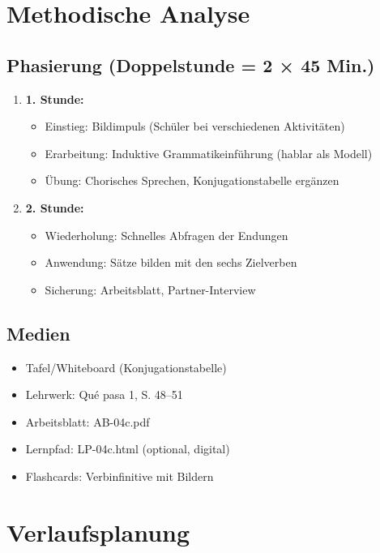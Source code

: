 \documentclass[11pt,a4paper]{article}
\newcommand{\lehrwerk}{Qué pasa 1}
\newcommand{\lehrwerkseite}{S. 48--51}
\begin{document}
\section{Methodische Analyse}

\subsection{Phasierung (Doppelstunde = 2 × 45 Min.)}
\begin{enumerate}
    \item \textbf{1. Stunde:}
    \begin{itemize}
        \item Einstieg: Bildimpuls (Schüler bei verschiedenen Aktivitäten)
        \item Erarbeitung: Induktive Grammatikeinführung (hablar als Modell)
        \item Übung: Chorisches Sprechen, Konjugationstabelle ergänzen
    \end{itemize}
    \item \textbf{2. Stunde:}
    \begin{itemize}
        \item Wiederholung: Schnelles Abfragen der Endungen
        \item Anwendung: Sätze bilden mit den sechs Zielverben
        \item Sicherung: Arbeitsblatt, Partner-Interview
    \end{itemize}
\end{enumerate}

\subsection{Medien}
\begin{itemize}
    \item Tafel/Whiteboard (Konjugationstabelle)
    \item Lehrwerk: \lehrwerk, \lehrwerkseite
    \item Arbeitsblatt: AB-04c.pdf
    \item Lernpfad: LP-04c.html (optional, digital)
    \item Flashcards: Verbinfinitive mit Bildern
\end{itemize}

\section{Verlaufsplanung}
\end{document}
